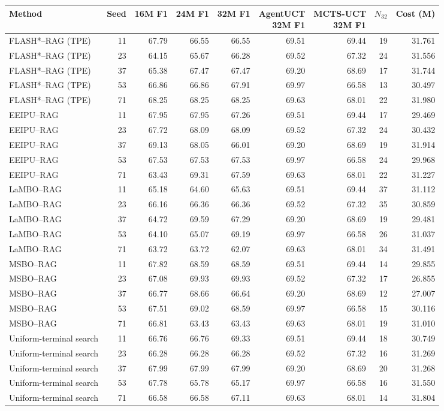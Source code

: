 \begin{tabular}{@{}lrrrrrrrr@{}}
\toprule
Method & Seed & 16M F1 & 24M F1 & 32M F1 & \shortstack{AgentUCT\\32M F1} & \shortstack{MCTS-UCT\\32M F1} & $N_{32}$ & Cost (M)\\
\midrule
FLASH*--RAG (TPE) & 11 & 67.79 & 66.55 & 66.55 & 69.51 & 69.44 & 19 & 31.761\\
FLASH*--RAG (TPE) & 23 & 64.15 & 65.67 & 66.28 & 69.52 & 67.32 & 24 & 31.556\\
FLASH*--RAG (TPE) & 37 & 65.38 & 67.47 & 67.47 & 69.20 & 68.69 & 17 & 31.744\\
FLASH*--RAG (TPE) & 53 & 66.86 & 66.86 & 67.91 & 69.97 & 66.58 & 13 & 30.497\\
FLASH*--RAG (TPE) & 71 & 68.25 & 68.25 & 68.25 & 69.63 & 68.01 & 22 & 31.980\\
\addlinespace
EEIPU--RAG & 11 & 67.95 & 67.95 & 67.26 & 69.51 & 69.44 & 17 & 29.469\\
EEIPU--RAG & 23 & 67.72 & 68.09 & 68.09 & 69.52 & 67.32 & 24 & 30.432\\
EEIPU--RAG & 37 & 69.13 & 68.05 & 66.01 & 69.20 & 68.69 & 19 & 31.914\\
EEIPU--RAG & 53 & 67.53 & 67.53 & 67.53 & 69.97 & 66.58 & 24 & 29.968\\
EEIPU--RAG & 71 & 63.43 & 69.31 & 67.59 & 69.63 & 68.01 & 22 & 31.227\\
\addlinespace
LaMBO--RAG & 11 & 65.18 & 64.60 & 65.63 & 69.51 & 69.44 & 37 & 31.112\\
LaMBO--RAG & 23 & 66.16 & 66.36 & 66.36 & 69.52 & 67.32 & 35 & 30.859\\
LaMBO--RAG & 37 & 64.72 & 69.59 & 67.29 & 69.20 & 68.69 & 19 & 29.481\\
LaMBO--RAG & 53 & 64.10 & 65.07 & 69.19 & 69.97 & 66.58 & 26 & 31.037\\
LaMBO--RAG & 71 & 63.72 & 63.72 & 62.07 & 69.63 & 68.01 & 34 & 31.491\\
\addlinespace
MSBO--RAG & 11 & 67.82 & 68.59 & 68.59 & 69.51 & 69.44 & 14 & 29.855\\
MSBO--RAG & 23 & 67.08 & 69.93 & 69.93 & 69.52 & 67.32 & 17 & 26.855\\
MSBO--RAG & 37 & 66.77 & 68.66 & 66.64 & 69.20 & 68.69 & 12 & 27.007\\
MSBO--RAG & 53 & 67.51 & 69.02 & 68.59 & 69.97 & 66.58 & 15 & 30.116\\
MSBO--RAG & 71 & 66.81 & 63.43 & 63.43 & 69.63 & 68.01 & 19 & 31.010\\
\addlinespace
Uniform-terminal search & 11 & 66.76 & 66.76 & 69.33 & 69.51 & 69.44 & 18 & 30.749\\
Uniform-terminal search & 23 & 66.28 & 66.28 & 66.28 & 69.52 & 67.32 & 16 & 31.269\\
Uniform-terminal search & 37 & 67.99 & 67.99 & 67.99 & 69.20 & 68.69 & 20 & 31.268\\
Uniform-terminal search & 53 & 67.78 & 65.78 & 65.17 & 69.97 & 66.58 & 16 & 31.550\\
Uniform-terminal search & 71 & 66.58 & 66.58 & 67.11 & 69.63 & 68.01 & 14 & 31.804\\
\bottomrule
\end{tabular}
